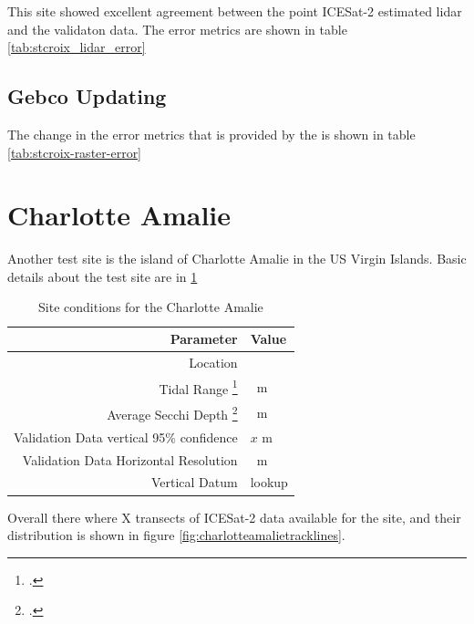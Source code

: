 This site showed excellent agreement between the point ICESat-2 estimated lidar and the validaton data. The error metrics are shown in table \ref{tab:stcroix_lidar_error}



\subsection{Gebco Updating}

The change in the error metrics that is provided by the  is shown in table \ref{tab:stcroix-raster-error}



\section{Charlotte Amalie}
Another test site is the island of Charlotte Amalie in the US Virgin Islands. Basic details about the test site are in \ref{table:charlotteamalie_datatable}
\begin{table}[h]
    \begin{minipage}{0.5\textwidth}
        \centering\begin{tabular}{r l }
            Parameter                                                 & \textbf{Value} \\
            \hline
            Location                                                  &                \\
            Tidal Range \footcite{Tidal_data_reanalysis2022}          & \qty{}{m}      \\
            Average Secchi Depth \footcite{ACRI-STGlobColourTeam2020} & \qty{}{m}      \\
            Validation Data vertical 95\% confidence                  & $x$ m          \\
            Validation Data Horizontal Resolution                     & \qty{}{m}      \\
            Vertical Datum                                            & lookup         \\
        \end{tabular}
    \end{minipage}
    \caption{Site conditions for the Charlotte Amalie}
    \label{table:charlotteamalie_datatable}
\end{table}
Overall there where X  transects of ICESat-2 data available for the site, and their distribution is shown in figure \ref{fig:charlotteamalietracklines}.

